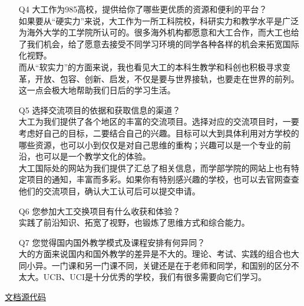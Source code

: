 \documentclass[10pt]{article}
\begin{document}
\begin{itemize}
{            }
        \item [{\large Q4}]{
            {\large 大工作为985高校，提供给你了哪些更优质的资源和便利的平台？} \\
            如果要从“硬实力”来说，大工作为一所工科院校，科研实力和教学水平是广泛为海外大学的工学院所认可的。很多海外机构都愿意和大工合作，而大工也给了我们机会，给了愿意去接受不同学习环境的同学各种各样的机会来拓宽国际化视野。 \\
            而从“软实力”的方面来说，我也看见大工的本科生教学和科创也积极寻求变革，开放、包容、创新、启发，不仅是要与世界接轨，也要走在世界的前列。这一点会极大地帮助我们日后的学习生活。
            }
        \item [{\large Q5}]{
            {\large 选择交流项目的依据和获取信息的渠道？} \\
            大工为我们提供了各个地区的丰富的交流项目。选择对应的交流项目时，一要考虑好自己的目标，二要结合自己的兴趣。目标可以大到具体利用对方学校的哪些资源，也可以小到仅仅是对自己思维的重构；兴趣可以是一个专业的前沿，也可以是一个教学文化的体验。 \\
            大工国际处的网站为我们提供了汇总了相关信息，而学部学院的网站上也有特定项目的通知，丰富而多彩。如果你有特别感兴趣的学校，也可以去官网查查他们的交流项目，确认大工认可后可以提交申请。
            }
        \item [{\large Q6}]{
            {\large 您参加大工交换项目有什么收获和体验？} \\
            实践了前沿知识、拓宽了视野，也锻炼了思维方式和综合能力。
            }
        \item [{\large Q7}]{
            {\large 您觉得国内国外教学模式及课程安排有何异同？} \\
            大的方面来说国内和国外教学的差异是不大的。理论、考试、实践的组合也大同小异。一门课和另一门课不同，关键还是在于老师和同学，和国别的区分不太大。UCB、UCI是十分优秀的学校，我们有很多需要向它们学习。
            }
    \end{itemize}
    \centering
    {\small \href{https://github.com/Ls-Dai/Notes/blob/main/Meeting%20Nov%2015/questions.tex}{文档源代码}}
\end{document}
